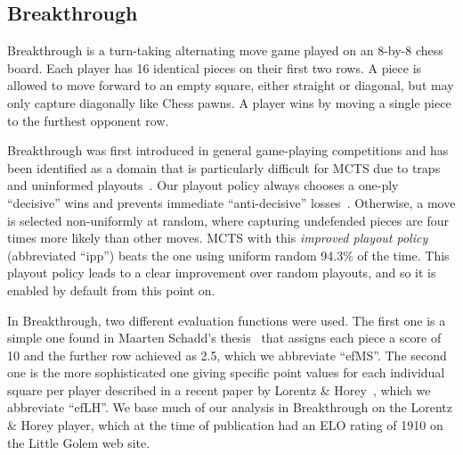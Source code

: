 \documentclass[conference]{IEEEtran}
\newcommand{\Update}{{\sc Update}}
\begin{document}
\subsection{Breakthrough}
\label{sec:bt}

Breakthrough is a turn-taking alternating move game played on an 8-by-8 chess board. Each player 
has 16 identical pieces on their first two rows. 
A piece is allowed to move forward to an empty square, either straight or diagonal, but may only 
capture diagonally like Chess pawns. A player wins by moving a single piece to the furthest opponent row. 

Breakthrough was first introduced in general game-playing competitions and has been identified as a domain 
that is particularly difficult for MCTS due to traps and uninformed playouts~\cite{Gudmundsson13Sufficiency}. 
Our playout policy always chooses a one-ply ``decisive'' wins and prevents immediate ``anti-decisive'' 
losses~\cite{Teytaud10On}.
Otherwise, a move is selected non-uniformly at random, where capturing undefended pieces are four times more
likely than other moves. 
MCTS with this {\it improved playout policy} (abbreviated ``ipp'') beats the one using uniform random 
94.3\% of the time. This playout policy leads to a clear improvement over random playouts, and so it is enabled 
by default from this point on.

In Breakthrough, two different evaluation functions were used. The first one is a simple one found in 
Maarten Schadd's thesis~\cite{Schadd11PhdThesis} 
that assigns each piece a score of 10 and the further row achieved as 2.5, which we abbreviate ``efMS''. The second 
one is the more sophisticated one giving specific point values for each individual square per player 
described in a recent paper by Lorentz \& Horey~\cite{Lorentz13Breakthrough}, which we abbreviate ``efLH''. 
We base much of our analysis in Breakthrough on the Lorentz \& Horey player, which 
at the time of publication had an ELO rating of 1910 on the Little Golem web site. 


\end{document}
